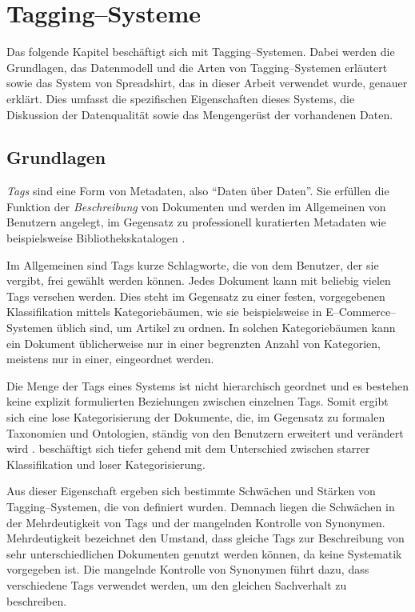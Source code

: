 \chapter{Tagging--Systeme}
\label{tagging}

Das folgende Kapitel beschäftigt sich mit Tagging--Systemen. Dabei werden die Grundlagen, das Datenmodell und die Arten von Tagging--Systemen erläutert sowie das System von Spreadshirt, das in dieser Arbeit verwendet wurde, genauer erklärt. Dies umfasst die spezifischen Eigenschaften dieses Systems, die Diskussion der Datenqualität sowie das Mengengerüst der vorhandenen Daten.

\section{Grundlagen}
\label{tagging_basics}

\emph{Tags} sind eine Form von Metadaten, also ``Daten über Daten''. Sie erfüllen die Funktion der \emph{Beschreibung} von Dokumenten und werden im Allgemeinen von Benutzern angelegt, im Gegensatz zu professionell kuratierten Metadaten wie beispielsweise Bibliothekskatalogen \cite{ma2004}.

Im Allgemeinen sind Tags kurze Schlagworte, die von dem Benutzer, der sie vergibt, frei gewählt werden können. Jedes Dokument kann mit beliebig vielen Tags versehen werden. Dies steht im Gegensatz zu einer festen, vorgegebenen Klassifikation mittels Kategoriebäumen, wie sie beispielsweise in E--Commerce--Systemen üblich sind, um Artikel zu ordnen. In solchen Kategoriebäumen kann ein Dokument üblicherweise nur in einer begrenzten Anzahl von Kategorien, meistens nur in einer, eingeordnet werden.

Die Menge der Tags eines Systems ist nicht hierarchisch geordnet und es bestehen keine explizit formulierten Beziehungen zwischen einzelnen Tags. Somit ergibt sich eine lose Kategorisierung der Dokumente, die, im Gegensatz zu formalen Taxonomien und Ontologien, ständig von den Benutzern erweitert und verändert wird \cite{sc2005}. \textcite{je2004} beschäftigt sich tiefer gehend mit dem Unterschied zwischen starrer Klassifikation und loser Kategorisierung.

Aus dieser Eigenschaft ergeben sich bestimmte Schwächen und Stärken von Tagging--Systemen, die von \textcite{ma2004} definiert wurden. Demnach liegen die Schwächen in der Mehrdeutigkeit von Tags und der mangelnden Kontrolle von Synonymen. Mehrdeutigkeit bezeichnet den Umstand, dass gleiche Tags zur Beschreibung von sehr unterschiedlichen Dokumenten genutzt werden können, da keine Systematik vorgegeben ist. Die mangelnde Kontrolle von Synonymen führt dazu, dass verschiedene Tags verwendet werden, um den gleichen Sachverhalt zu beschreiben.

